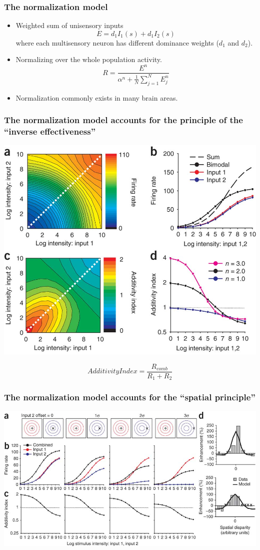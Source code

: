 \documentclass{beamer}
\begin{document}
\begin{frame}
  \frametitle{The normalization model \cite{ohshiro_normalization_2011}}
  \begin{itemize}
    \item Weighted sum of unisensory inputs
\begin{equation}
  E = d_1 I_1(s) + d_1 I_2(s)
  \label{eq:step1}
\end{equation}
    where each multisensory neuron has different dominance weights ($d_1$ and $d_2$).
    \item Normalizing over the whole population activity.
\begin{equation}
  R = \frac{E^n}{\alpha^n+\frac{1}{N}\sum_{j=1}^N E_j^n}
  \label{eq:step2}
\end{equation}
    \item Normalization commonly exists in many brain areas.
  \end{itemize}
\end{frame}


\begin{frame}
  \frametitle{The normalization model accounts for the principle of the ``inverse effectiveness'' \cite{ohshiro_normalization_2011}}
  \begin{center}
    \includegraphics[width=.6\textwidth]{inverse2}
  \end{center}
  \[ Additivity Index = \frac{R_{comb}}{R_1 + R_2} \]
\end{frame}

\begin{frame}
  \frametitle{The normalization model accounts for the ``spatial principle'' \cite{ohshiro_normalization_2011}}
  \begin{center}
    \includegraphics[width=\textwidth]{spatial}
  \end{center}
\end{frame}
\end{document}
